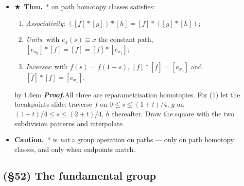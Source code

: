 \documentclass[12pt,a4paper]{article}
\newcommand{\Thm}{\textbf{Thm.}~}
\newcommand{\Warn}{\textbf{Caution.}~}
\newcommand{\Key}{$\bigstar$~}                  %
\newcommand{\Pf}[1]{%
  \par\addvspace{7pt}\nopagebreak
  \begingroup
    \advance\leftskip by 1.6em
    \parindent=0pt \small\color{prf}%
    \textbf{\textit{Proof.}}\enspace #1\par
  \endgroup
  \addvspace{9pt}}
\newenvironment{BL}%
  {\begin{itemize}[leftmargin=1.4em,labelsep=0.55em,itemsep=11pt,topsep=11pt,parsep=0pt]}%
  {\end{itemize}}
\newenvironment{NL}%
  {\begin{enumerate}[label=(\arabic*),leftmargin=2em,labelsep=0.45em,itemsep=6pt,topsep=7pt,parsep=0pt]}%
  {\end{enumerate}}
\begin{document}
\begin{BL}
      Hence $[f]*[g]=[f*g]$ is well defined.
\item \Key\Thm $*$ on path homotopy classes satisfies:
  \begin{NL}
  \item \emph{Associativity}: $([f]*[g])*[h]=[f]*([g]*[h])$;
  \item \emph{Units}: with $e_x(s)\equiv x$ the constant path,
        $[e_{x_0}]*[f]=[f]=[f]*[e_{x_1}]$;
  \item \emph{Inverses}: with $\bar f(s)=f(1-s)$,
        $[f]*[\bar f]=[e_{x_0}]$ and $[\bar f]*[f]=[e_{x_1}]$.
  \end{NL}
\Pf{All three are reparametrisation homotopies. For (1) let the breakpoints slide:
traverse $f$ on $0\le s\le(1+t)/4$, $g$ on $(1+t)/4\le s\le(2+t)/4$, $h$ thereafter.
Draw the square with the two subdivision patterns and interpolate.}
\item \Warn $*$ is \emph{not} a group operation on paths --- only on path homotopy classes,
      and only when endpoints match.
\end{BL}

\subsection{(\S52) The fundamental group}
\end{document}
